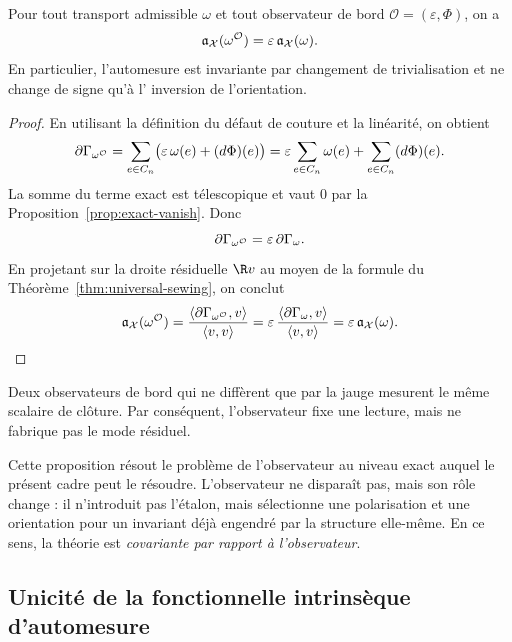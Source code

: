 \begin{proposition}\label{prop:observer-covariance}
Pour tout transport admissible $\omega$ et tout observateur de bord
$\mathcal O=(\varepsilon,\Phi)$, on a
\[
\mathfrak a_\mathcal X(\omega^{\mathcal O})=\varepsilon\,\mathfrak a_\mathcal X(\omega).
\]
En particulier, l'automesure est invariante par changement de trivialisation et ne change de signe qu'à l'
inversion de l'orientation.
\end{proposition}

\begin{proof}
En utilisant la définition du défaut de couture et la linéarité, on obtient
\[
\partial\Gamma_{\omega^{\mathcal O}}
=
\sum_{e\in C_n}\bigl(\varepsilon\,\omega(e)+(d\Phi)(e)\bigr)
=
\varepsilon\sum_{e\in C_n}\omega(e)+\sum_{e\in C_n}(d\Phi)(e).
\]
La somme du terme exact est télescopique et vaut $0$ par la
Proposition~\ref{prop:exact-vanish}. Donc
\[
\partial\Gamma_{\omega^{\mathcal O}}=\varepsilon\,\partial\Gamma_\omega.
\]
En projetant sur la droite résiduelle $\R v$ au moyen de la formule du
Théorème~\ref{thm:universal-sewing}, on conclut
\[
\mathfrak a_\mathcal X(\omega^{\mathcal O})
=
\frac{\langle \partial\Gamma_{\omega^{\mathcal O}},v\rangle}{\langle v,v\rangle}
=
\varepsilon\,\frac{\langle \partial\Gamma_\omega,v\rangle}{\langle v,v\rangle}
=
\varepsilon\,\mathfrak a_\mathcal X(\omega).
\]
\end{proof}

\begin{corollary}\label{cor:observer-does-not-create}
Deux observateurs de bord qui ne diffèrent que par la jauge mesurent le même scalaire de clôture. Par conséquent,
l'observateur fixe une lecture, mais ne fabrique pas le mode résiduel.
\end{corollary}

\begin{remark}
Cette proposition résout le problème de l'observateur au niveau exact auquel le présent cadre
peut le résoudre. L'observateur ne disparaît pas, mais son rôle change : il n'introduit pas l'étalon, mais
sélectionne une polarisation et une orientation pour un invariant déjà engendré par la
structure elle-même. En ce sens, la théorie est \emph{covariante par rapport à l'observateur}.
\end{remark}

\subsection{Unicité de la fonctionnelle intrinsèque d'automesure}

